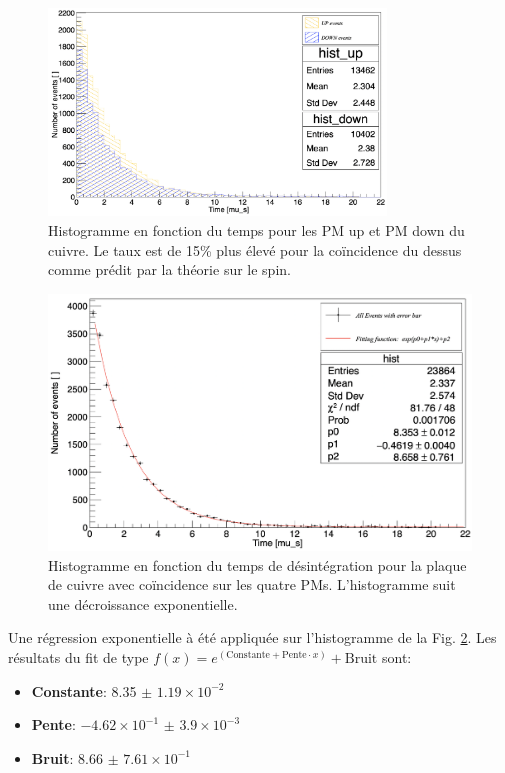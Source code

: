 \documentclass[12pt]{article}
\begin{document}
\begin{figure}[htpb!]
    \centering
    \includegraphics[width=0.8\textwidth]{graphiques/experience1/cuivre/comptage_cuivre_up_down_separement.png}
    \caption{Histogramme en fonction du temps pour les PM up et PM down du cuivre. Le taux est de 15\% plus élevé pour la coïncidence du dessus comme prédit par la théorie sur le spin.}
    \label{fig:comptage_cuivre_up_down_separement}
\end{figure}

\begin{figure}[htpb!]
    \centering
    \includegraphics[width=\textwidth]{graphiques/experience1/cuivre/comptage_total_cuivre.png}
    \caption{Histogramme en fonction du temps de désintégration pour la plaque de cuivre avec coïncidence sur les quatre PMs. L'histogramme suit une décroissance exponentielle.}
    \label{fig:comptage_total_cuivre}
\end{figure}

Une régression exponentielle à été appliquée sur l'histogramme de la Fig. \ref{fig:comptage_total_cuivre}. Les résultats du fit de type $f(x) = e^{(\text{Constante}+\text{Pente}\cdot x)}+\text{Bruit}$ sont:
    \begin{itemize}
        \item \textbf{Constante}: 8.35 $\pm$ $1.19\times10^{-2}$
        \item \textbf{Pente}: $-4.62\times10^{-1}$ $\pm$ $3.9\times10^{-3}$
        \item \textbf{Bruit}: 8.66 $\pm$ $7.61\times10^{-1}$
    \end{itemize}
    
\end{document}
